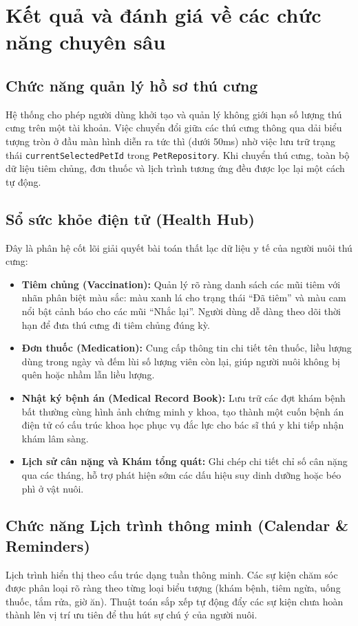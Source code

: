 \section{Kết quả và đánh giá về các chức năng chuyên sâu}
\label{sec:danh_gia_chuc_nang_chuyen_sau}

\subsection{Chức năng quản lý hồ sơ thú cưng}
Hệ thống cho phép người dùng khởi tạo và quản lý không giới hạn số lượng thú cưng trên một tài khoản. Việc chuyển đổi giữa các thú cưng thông qua dải biểu tượng tròn ở đầu màn hình diễn ra tức thì (dưới 50ms) nhờ việc lưu trữ trạng thái \texttt{currentSelectedPetId} trong \texttt{PetRepository}. Khi chuyển thú cưng, toàn bộ dữ liệu tiêm chủng, đơn thuốc và lịch trình tương ứng đều được lọc lại một cách tự động.

\subsection{Sổ sức khỏe điện tử (Health Hub)}
Đây là phân hệ cốt lõi giải quyết bài toán thất lạc dữ liệu y tế của người nuôi thú cưng:
\begin{itemize}
    \item \textbf{Tiêm chủng (Vaccination):} Quản lý rõ ràng danh sách các mũi tiêm với nhãn phân biệt màu sắc: màu xanh lá cho trạng thái ``Đã tiêm'' và màu cam nổi bật cảnh báo cho các mũi ``Nhắc lại''. Người dùng dễ dàng theo dõi thời hạn để đưa thú cưng đi tiêm chủng đúng kỳ.
    \item \textbf{Đơn thuốc (Medication):} Cung cấp thông tin chi tiết tên thuốc, liều lượng dùng trong ngày và đếm lùi số lượng viên còn lại, giúp người nuôi không bị quên hoặc nhầm lẫn liều lượng.
    \item \textbf{Nhật ký bệnh án (Medical Record Book):} Lưu trữ các đợt khám bệnh bất thường cùng hình ảnh chứng minh y khoa, tạo thành một cuốn bệnh án điện tử có cấu trúc khoa học phục vụ đắc lực cho bác sĩ thú y khi tiếp nhận khám lâm sàng.
    \item \textbf{Lịch sử cân nặng và Khám tổng quát:} Ghi chép chi tiết chỉ số cân nặng qua các tháng, hỗ trợ phát hiện sớm các dấu hiệu suy dinh dưỡng hoặc béo phì ở vật nuôi.
\end{itemize}

\subsection{Chức năng Lịch trình thông minh (Calendar \& Reminders)}
Lịch trình hiển thị theo cấu trúc dạng tuần thông minh. Các sự kiện chăm sóc được phân loại rõ ràng theo từng loại biểu tượng (khám bệnh, tiêm ngừa, uống thuốc, tắm rửa, giờ ăn). Thuật toán sắp xếp tự động đẩy các sự kiện chưa hoàn thành lên vị trí ưu tiên để thu hút sự chú ý của người nuôi.

